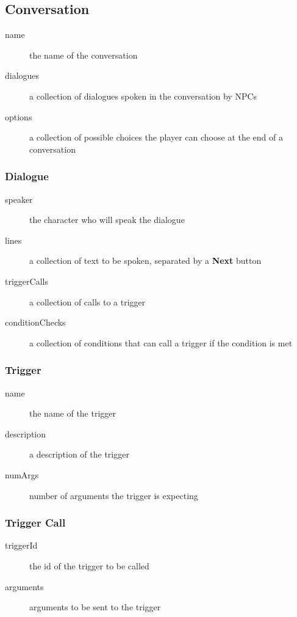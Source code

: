 \subsection{Conversation}
\begin{description}
\item[name]{the name of the conversation}
\item[dialogues]{a collection of dialogues spoken in the conversation by NPCs}
\item[options]{a collection of possible choices the player can choose at the end of a conversation}
\end{description}

\subsubsection{Dialogue}
\begin{description}
\item[speaker]{the character who will speak the dialogue}
\item[lines]{a collection of text to be spoken, separated by a \textbf{Next} button}
\item[triggerCalls]{a collection of calls to a trigger}
\item[conditionChecks]{a collection of conditions that can call a trigger if the condition is met}
\end{description}

\subsubsection{Trigger}
\begin{description}
\item[name]{the name of the trigger}
\item[description]{a description of the trigger}
\item[numArgs]{number of arguments the trigger is expecting}
\end{description}

\subsubsection{Trigger Call}
\begin{description}
\item[triggerId]{the id of the trigger to be called}
\item[arguments]{arguments to be sent to the trigger}
\end{description}

